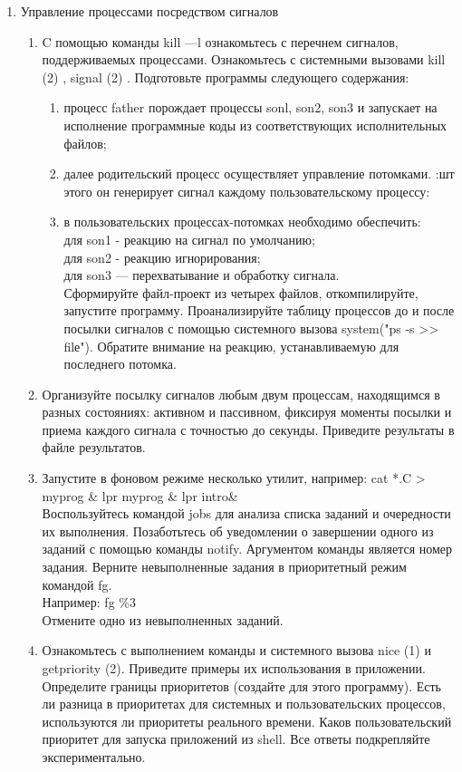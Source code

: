 \documentclass[a4paper]{article}
\begin{document}
\begin{enumerate}
	\item Управление процессами посредством сигналов
	\begin{enumerate}	
		\item C помощью команды kill —l ознакомьтесь с перечнем сигналов, поддерживаемых процессами. Ознакомьтесь с системными вызовами kill (2) , signal (2) . Подготовьте программы следующего содержания:
		\begin{enumerate}
			\item процесс father порождает процессы sonl, son2, son3 и запускает на исполнение программные коды из соответствующих исполнительных файлов;
			\item далее родительский процесс осуществляет управление потомками. :шт
этого он генерирует сигнал каждому пользовательскому процессу:
			\item в пользовательских процессах-потомках необходимо обеспечить:\\
				для son1 - реакцию на сигнал по умолчанию;\\
				для son2 - реакцию игнорирования;\\
				для son3 — перехватывание и обработку сигнала.\\
			Сформируйте файл-проект из четырех файлов, откомпилируйте, запустите программу. Проанализируйте таблицу процессов до и после посылки сигналов с помощью системного вызова system("ps -s >> filе"). Обратите внимание на реакцию, устанавливаемую для последнего потомка.
		\end{enumerate}	
		\item Организуйте посылку сигналов любым двум процессам, находящимся в разных состояниях: активном и пассивном, фиксируя моменты посылки и приема каждого сигнала с точностью до секунды. Приведите результаты в файле результатов.

		\item Запустите в фоновом режиме несколько утилит, например: cat *.C > myprog \& lpr myprog \& lpr intro\& \\ Воспользуйтесь командой jobs для анализа списка заданий и очередности их выполнения. Позаботьтесь об уведомлении о завершении одного из заданий с помощью команды notify. Аргументом команды является номер задания. Верните невыполненные задания в приоритетный режим командой fg.\\
Например: fg \%3\\
Отмените одно из невыполненных заданий.

		\item Ознакомьтесь с выполнением команды и системного вызова nice (1)
и getpriority (2). Приведите примеры их использования в приложении. Определите границы приоритетов (создайте для этого программу). Есть ли разница в приоритетах для системных и пользовательских процессов, используются ли приоритеты реального времени. Каков пользовательский приоритет для запуска приложений из shell. Все ответы подкрепляйте экспериментально.


\end{enumerate}
\end{enumerate}
\end{document}
